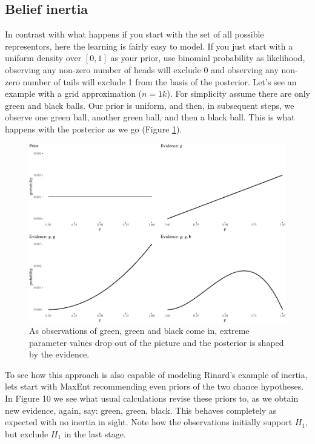 \documentclass[
  10pt,
  dvipsnames,enabledeprecatedfontcommands]{scrartcl}
\begin{document}
\hypertarget{belief-inertia-1}{%
\subsection{Belief inertia}\label{belief-inertia-1}}

In contrast with what happens if you start with the set of all possible
representors, here the learning is fairly easy to model. If you just
start with a uniform density over \([0,1]\) as your prior, use binomial
probability as likelihood, observing any non-zero number of heads will
exclude 0 and observing any non-zero number of tails will exclude 1 from
the basis of the posterior. Let's see an example with a grid
approximation (\(n=1k\)). For simplicity assume there are only green and
black balls. Our prior is uniform, and then, in subsequent steps, we
observe one green ball, another green ball, and then a black ball. This
is what happens with the posterior as we go (Figure
\ref{fig:intertia2}).

\begin{figure}[H]

\begin{center}\includegraphics[width=1\linewidth]{impreciseEpistemicFINAL_files/figure-latex/fig:inertia2-1} \end{center}
\caption{As observations of green, green and black come in, extreme parameter values drop out of the picture and the posterior is shaped by the evidence.}
\label{fig:intertia2}
\end{figure}

To see how this approach is also capable of modeling Rinard's example of
inertia, lets start with MaxEnt recommending even priors of the two
chance hypotheses. In Figure 10 we see what usual calculations revise
these priors to, as we obtain new evidence, again, say: green, green,
black. This behaves completely as expected with no inertia in sight.
Note how the observations initially support \(H_1\), but exclude \(H_1\)
in the last stage.
\end{document}
